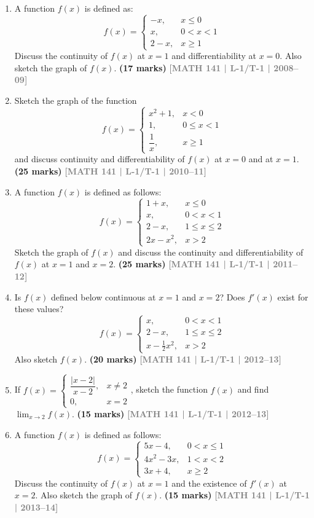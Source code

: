 \documentclass[12pt,a4paper]{article}
\newcommand{\yr}[1]{\hfill\textcolor{gray}{\small\textbf{[#1]}}}
\newcommand{\mk}[1]{\textcolor{orange!70!black}{\small\textbf{(#1 marks)}}}
\begin{document}
\begin{enumerate}
\item A function $f(x)$ is defined as:
\[
f(x)=\begin{cases}-x, & x\le 0\\ x, & 0<x<1\\ 2-x, & x\ge 1\end{cases}
\]
Discuss the continuity of $f(x)$ at $x=1$ and differentiability at $x=0$. Also sketch the graph of $f(x)$.
\mk{17} \yr{MATH 141 | L-1/T-1 | 2008--09}

\item Sketch the graph of the function
\[
f(x)=\begin{cases}x^{2}+1, & x<0\\ 1, & 0\le x<1\\ \dfrac{1}{x}, & x\ge 1\end{cases}
\]
and discuss continuity and differentiability of $f(x)$ at $x=0$ and at $x=1$.
\mk{25} \yr{MATH 141 | L-1/T-1 | 2010--11}

\item A function $f(x)$ is defined as follows:
\[
f(x)=\begin{cases}1+x, & x\le 0\\ x, & 0<x<1\\ 2-x, & 1\le x\le 2\\ 2x-x^{2}, & x>2\end{cases}
\]
Sketch the graph of $f(x)$ and discuss the continuity and differentiability of $f(x)$ at $x=1$ and $x=2$.
\mk{25} \yr{MATH 141 | L-1/T-1 | 2011--12}

\item Is $f(x)$ defined below continuous at $x=1$ and $x=2$? Does $f'(x)$ exist for these values?
\[
f(x)=\begin{cases}x, & 0<x<1\\ 2-x, & 1\le x\le 2\\ x-\tfrac{1}{2}x^{2}, & x>2\end{cases}
\]
Also sketch $f(x)$.
\mk{20} \yr{MATH 141 | L-1/T-1 | 2012--13}

\item If $f(x)=\begin{cases}\dfrac{|x-2|}{x-2}, & x\neq 2\\[4pt] 0, & x=2\end{cases}$, sketch the function $f(x)$ and find $\displaystyle\lim_{x\to 2}f(x)$.
\mk{15} \yr{MATH 141 | L-1/T-1 | 2012--13}

\item A function $f(x)$ is defined as follows:
\[
f(x)=\begin{cases}5x-4, & 0<x\le 1\\ 4x^{2}-3x, & 1<x<2\\ 3x+4, & x\ge 2\end{cases}
\]
Discuss the continuity of $f(x)$ at $x=1$ and the existence of $f'(x)$ at $x=2$. Also sketch the graph of $f(x)$.
\mk{15} \yr{MATH 141 | L-1/T-1 | 2013--14}


\end{enumerate}
\end{document}
